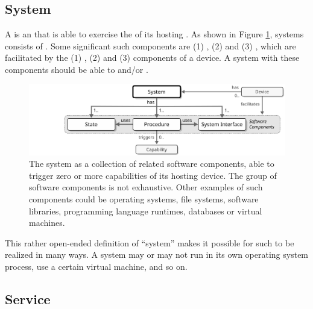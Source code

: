 \subsection{System}
\label{sec:reference-model:system}

A  is an   that is able to exercise the  of its hosting .
As shown in Figure \ref{fig:system}, systems consists of .
Some significant such components are (1) , (2)  and (3) , which are facilitated by the (1) , (2)  and (3)  components of a device.
A system with these components should be able to  and/or  .

\begin{figure}[ht!]
  \centering
  \includegraphics[scale=0.9]{figures/system}
  \caption{
    The system as a collection of related software components, able to trigger zero or more capabilities of its hosting device.
    The group of software components is not exhaustive.
    Other examples of such components could be operating systems, file systems, software libraries, programming language runtimes, databases or virtual machines.
  }
  \label{fig:system}
\end{figure}

This rather open-ended definition of ``system'' makes it possible for such to be realized in many ways.
A system may or may not run in its own operating system process, use a certain virtual machine, and so on.

\subsection{Service}
\label{sec:reference-model:service}

